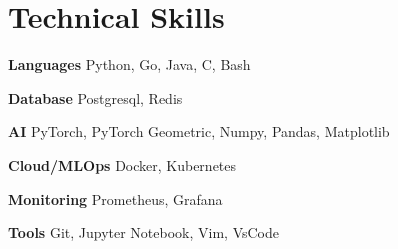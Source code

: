 \section{Technical Skills}

\begin{multicols}{2}
\begin{compactitem}
        \item \textbf{Languages} Python, Go, Java, C, Bash 
        \item \textbf{Database} Postgresql, Redis
        \item \textbf{AI} PyTorch, PyTorch Geometric, Numpy, Pandas, Matplotlib 
        \item \textbf{Cloud/MLOps} Docker, Kubernetes 
        \item \textbf{Monitoring} Prometheus, Grafana 
        \item \textbf{Tools} Git, Jupyter Notebook, Vim, VsCode
\end{compactitem}
\end{multicols}
